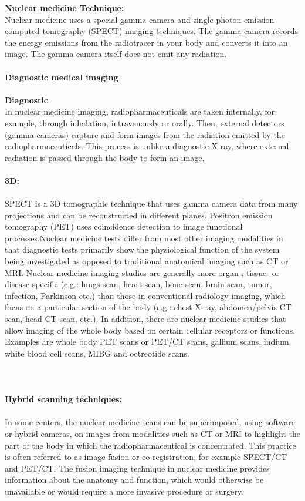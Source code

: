 \documentclass[12pt]{article}
\begin{document}
\noindent \textbf{\large Nuclear medicine Technique:} \\ Nuclear medicine uses a special gamma camera and single-photon emission-computed tomography (SPECT) imaging techniques. The gamma camera records the energy emissions from the radiotracer in your body and converts it into an image. The gamma camera itself does not emit any radiation. \\ \\
\noindent \textbf{\large Diagnostic medical imaging} \\ \\ \noindent \textbf{\large Diagnostic } \\ In nuclear medicine imaging, radiopharmaceuticals are taken internally, for example, through inhalation, intravenously or orally. Then, external detectors (gamma cameras) capture and form images from the radiation emitted by the radiopharmaceuticals. This process is unlike a diagnostic X-ray, where external radiation is passed through the body to form an image. \\ \\ \noindent \textbf{\large 3D:} \\ \\ SPECT is a 3D tomographic technique that uses gamma camera data from many projections and can be reconstructed in different planes. Positron emission tomography (PET) uses coincidence detection to image functional processes.Nuclear medicine tests differ from most other imaging modalities in that diagnostic tests primarily show the physiological function of the system being investigated as opposed to traditional anatomical imaging such as CT or MRI. Nuclear medicine imaging studies are generally more organ-, tissue- or disease-specific (e.g.: lungs scan, heart scan, bone scan, brain scan, tumor, infection, Parkinson etc.) than those in conventional radiology imaging, which focus on a particular section of the body (e.g.: chest X-ray, abdomen/pelvis CT scan, head CT scan, etc.). In addition, there are nuclear medicine studies that allow imaging of the whole body based on certain cellular receptors or functions. Examples are whole body PET scans or PET/CT scans, gallium scans, indium white blood cell scans, MIBG and octreotide scans. \\ \\

\\ \\ \noindent \textbf{\large Hybrid scanning techniques:} \\ \\ In some centers, the nuclear medicine scans can be superimposed, using software or hybrid cameras, on images from modalities such as CT or MRI to highlight the part of the body in which the radiopharmaceutical is concentrated. This practice is often referred to as image fusion or co-registration, for example SPECT/CT and PET/CT. The fusion imaging technique in nuclear medicine provides information about the anatomy and function, which would otherwise be unavailable or would require a more invasive procedure or surgery.


\end{document}
